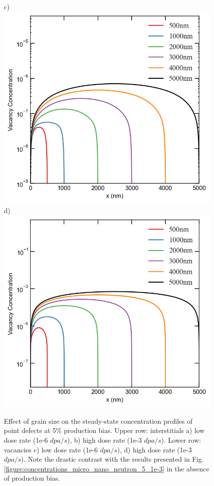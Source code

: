 \documentclass[utf8]{frontiersSCNS} %
\begin{document}
\begin{figure}[h!]
        c)\includegraphics[scale=0.55]{Fig5_c}
        d)\includegraphics[scale=0.55]{Fig5_d}
        \caption{Effect of grain size on the steady-state concentration profiles of point defects at 5\% production bias. Upper row: interstitials a) low dose rate (1e-6 $dpa/s$), b) high dose rate (1e-3 $dpa/s$). Lower row: vacancies c) low dose rate (1e-6 $dpa/s$), d) high dose rate (1e-3 $dpa/s$). Note the drastic contrast with the results presented in Fig. \ref{figure:concentrations_micro_nano_neutron_5_1e-3} in the absence of production bias.}
        \label{figure:concentrations_neutron_5}
    \end{figure}
    
\end{document}
